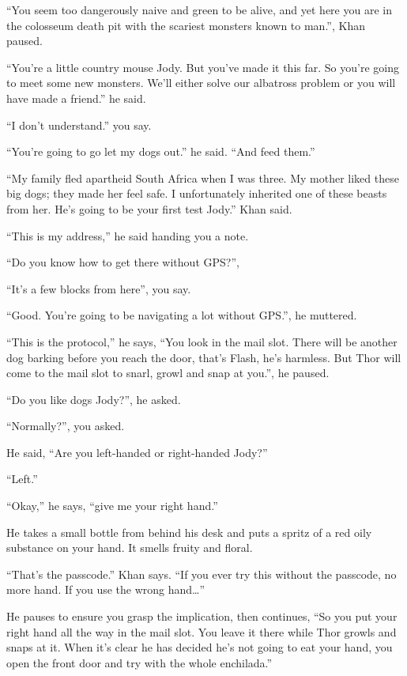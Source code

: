 \documentclass[17pt, twoside, a5paper, openright, extrafontsizes]{memoir}
\begin{document}
``You seem too dangerously naive and green to be alive, and yet here you
are in the colosseum death pit with the scariest monsters known to
man.'', Khan paused.

``You're a little country mouse Jody. But you've made it this far. So
you're going to meet some new monsters. We'll either solve our albatross
problem or you will have made a friend.'' he said.

``I don't understand.'' you say.

``You're going to go let my dogs out.'' he said. ``And feed them.''

``My family fled apartheid South Africa when I was three. My mother
liked these big dogs; they made her feel safe. I unfortunately inherited
one of these beasts from her. He's going to be your first test Jody.''
Khan said.

``This is my address,'' he said handing you a note.

``Do you know how to get there without GPS?'',

``It's a few blocks from here'', you say.

``Good. You're going to be navigating a lot without GPS.'', he muttered.

``This is the protocol,'' he says, ``You look in the mail slot. There
will be another dog barking before you reach the door, that's Flash,
he's harmless. But Thor will come to the mail slot to snarl, growl and
snap at you.'', he paused.

``Do you like dogs Jody?'', he asked.

``Normally?'', you asked.

He said, ``Are you left-handed or right-handed Jody?''

``Left.''

``Okay,'' he says, ``give me your right hand.''

He takes a small bottle from behind his desk and puts a spritz of a red
oily substance on your hand. It smells fruity and floral.

``That's the passcode.'' Khan says. ``If you ever try this without the
passcode, no more hand. If you use the wrong hand\ldots{}''

He pauses to ensure you grasp the implication, then continues, ``So you
put your right hand all the way in the mail slot. You leave it there
while Thor growls and snaps at it. When it's clear he has decided he's
not going to eat your hand, you open the front door and try with the
whole enchilada.''
\end{document}
